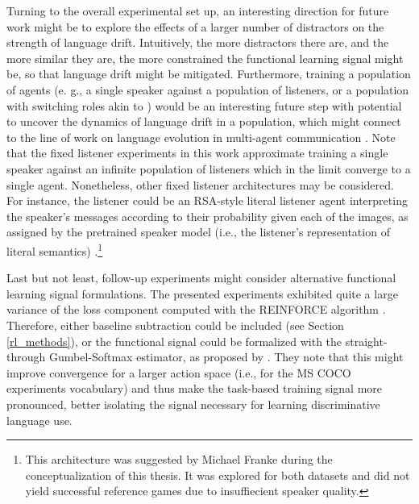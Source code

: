 Turning to the overall experimental set up, an interesting direction for future work might be to explore the effects of a larger number of distractors on the strength of language drift. Intuitively, the more distractors there are, and the more similar they are, the more constrained the functional learning signal might be, so that language drift might be mitigated.  Furthermore, training a population of agents (e. g., a single speaker against a population of listeners, or a population with switching roles akin to \cite{bouchacourt2019miss}) would be an interesting future step with potential to uncover the dynamics of language drift in a population, which might connect to the line of work on language evolution in multi-agent communication \parencite[e.~g.,][]{graesser2019emergent, chaabouni2019anti, kirby2014iterated}. Note that the fixed listener experiments in this work approximate training a single speaker against an infinite population of listeners which in the limit converge to a single agent. Nonetheless, other fixed listener architectures may be considered. For instance, the listener could be an RSA-style literal listener agent interpreting the speaker's messages according to their probability given each of the images, as assigned by the pretrained speaker model (i.e., the listener's representation of literal semantics) \parencite{frank2016rational}.\footnote{This architecture was suggested by Michael Franke during the conceptualization of this thesis. It was explored for both datasets and did not yield successful reference games due to insuffiecient speaker quality.} 

Last but not least, follow-up experiments might consider alternative functional learning signal formulations. The presented experiments exhibited quite a large variance of the loss component computed with the REINFORCE algorithm . Therefore, either baseline subtraction could be included (see Section \ref{rl_methods}), or the functional signal could be formalized with the straight-through Gumbel-Softmax estimator, as proposed by \cite{havrylov2017emergence}. They note that this might improve convergence for a larger action space (i.e., for the MS COCO experiments vocabulary) and thus make the task-based training signal more pronounced, better isolating the signal necessary for learning discriminative language use.

